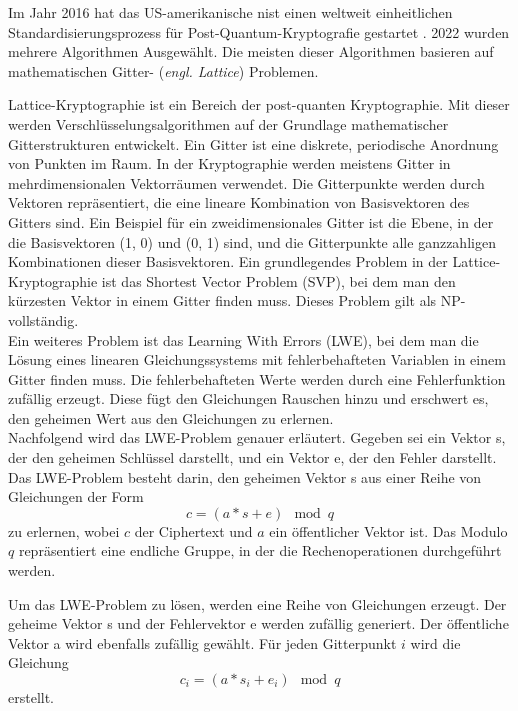 Im Jahr 2016 hat das US-amerikanische \ac{nist} einen weltweit einheitlichen Standardisierungsprozess für Post-Quantum-Kryptografie gestartet \cite{moodyStatusReportThird2022}.
2022 wurden mehrere Algorithmen Ausgewählt. Die meisten dieser Algorithmen basieren auf mathematischen Gitter- (\textit{engl. Lattice}) Problemen.

Lattice-Kryptographie \cite{micciancioLatticebasedCryptography} ist ein Bereich der post-quanten Kryptographie. 
Mit dieser werden Verschlüsselungsalgorithmen auf der Grundlage mathematischer Gitterstrukturen entwickelt. 
Ein Gitter ist eine diskrete, periodische Anordnung von Punkten im Raum. In der Kryptographie werden meistens Gitter in mehrdimensionalen Vektorräumen verwendet.
Die Gitterpunkte werden durch Vektoren repräsentiert, die eine lineare Kombination von Basisvektoren des Gitters sind. 
Ein Beispiel für ein zweidimensionales Gitter ist die Ebene, in der die Basisvektoren (1, 0) und (0, 1) sind, 
und die Gitterpunkte alle ganzzahligen Kombinationen dieser Basisvektoren.
Ein grundlegendes Problem in der Lattice-Kryptographie ist das Shortest Vector Problem (SVP), bei dem man den kürzesten Vektor in einem Gitter finden muss. 
Dieses Problem gilt als NP-vollständig. \cite[Abs. 2.1]{wangLatticebasedCryptosystemsStandardisation2023}\\

Ein weiteres Problem ist das Learning With Errors (LWE), bei dem man die Lösung eines linearen Gleichungssystems mit fehlerbehafteten Variablen in einem Gitter finden muss.
Die fehlerbehafteten Werte werden durch eine Fehlerfunktion zufällig erzeugt. 
Diese fügt den Gleichungen Rauschen hinzu und erschwert es, den geheimen Wert aus den Gleichungen zu erlernen.\\

Nachfolgend wird das LWE-Problem genauer erläutert.
Gegeben sei ein Vektor s, der den geheimen Schlüssel darstellt, und ein Vektor e, der den Fehler darstellt. 
Das LWE-Problem besteht darin, den geheimen Vektor s aus einer Reihe von Gleichungen der Form 
$$c = (a * s + e)\mod{q}$$ zu erlernen, wobei $c$ der Ciphertext und $a$ ein öffentlicher Vektor ist. 
Das Modulo $q$ repräsentiert eine endliche Gruppe, in der die Rechenoperationen durchgeführt werden.

Um das LWE-Problem zu lösen, werden eine Reihe von Gleichungen erzeugt. Der geheime Vektor s und der Fehlervektor e werden zufällig generiert. 
Der öffentliche Vektor a wird ebenfalls zufällig gewählt. Für jeden Gitterpunkt $i$ wird die Gleichung 
$$c_i = (a * s_i + e_i) \mod{q}$$ 
erstellt.

